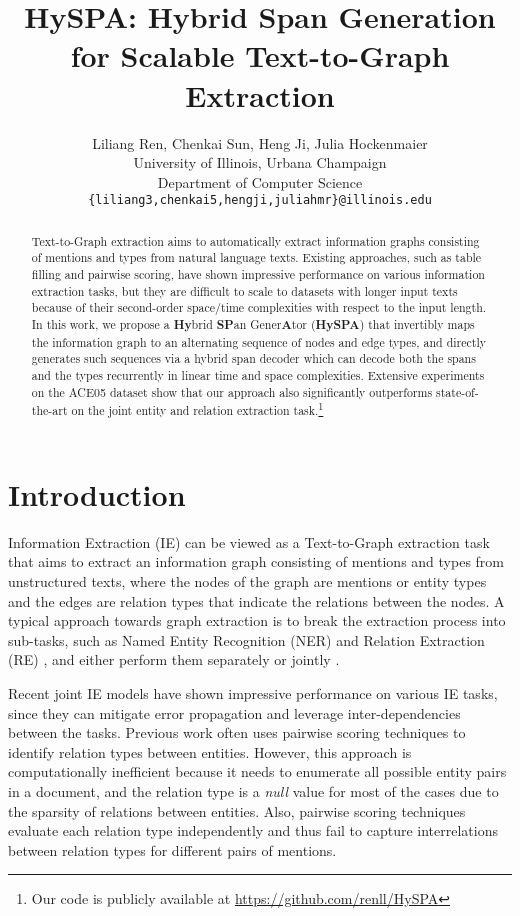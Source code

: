 \documentclass[11pt,a4paper]{article}
\title{HySPA: Hybrid Span Generation for Scalable Text-to-Graph Extraction}
\author{Liliang Ren, Chenkai Sun,  Heng Ji, Julia Hockenmaier\\ 
  University of Illinois, Urbana Champaign\\
  Department of Computer Science \\
  \texttt{\{liliang3,chenkai5,hengji,juliahmr\}@illinois.edu}
  }
\date{}
\begin{document}
\maketitle
\begin{abstract}
Text-to-Graph extraction aims to automatically extract information graphs consisting of mentions and types from natural language texts. Existing approaches, such as table filling and pairwise scoring, have shown impressive performance on various information extraction tasks, but they are difficult to scale to datasets with longer input texts because of their second-order space/time complexities with respect to the input length. In this work, we propose a \textbf{Hy}brid \textbf{SP}an Gener\textbf{A}tor (\textbf{HySPA}) that invertibly maps the information graph to an alternating sequence of nodes and edge types, and directly generates such sequences via a hybrid span decoder which can decode both the spans and the types recurrently in linear time and space complexities. Extensive experiments on the ACE05 dataset show that our approach also significantly outperforms state-of-the-art on the joint entity and relation extraction task.\footnote{Our code is publicly available at \url{https://github.com/renll/HySPA}
}
\end{abstract}
\section{Introduction}

Information Extraction (IE) can be viewed as a Text-to-Graph extraction task that aims to extract an information graph \cite{li-etal-2014-constructing,hgraph} consisting of mentions and types from unstructured texts, where the nodes of the graph are mentions or entity types and the edges are relation types that indicate the relations between the nodes. A typical approach towards graph extraction is to break the extraction process into sub-tasks, such as Named Entity Recognition (NER) \cite{florian-etal-2006-factorizing,florian-etal-2010-improving} and Relation Extraction (RE) \cite{sun-etal-2011-semi,jiang-zhai-2007-systematic}, and either perform them separately \cite{chan-roth-2011-exploiting} or jointly \cite{li-ji-2014-incremental,eberts2019span}.

Recent joint IE models \cite{dygie,tse,lin-etal-2020-joint}  have shown impressive performance on various IE tasks, since they can mitigate  error propagation  and leverage  inter-dependencies between the tasks. 
Previous work often uses pairwise scoring techniques to identify relation types between entities. However, this approach is computationally inefficient because it needs to enumerate all possible entity pairs in a document, and the relation type is a \emph{null} value for most of the cases due to the sparsity of relations between entities. Also,  pairwise scoring techniques evaluate each relation type independently and thus fail to capture  interrelations between relation types for different pairs of mentions.
\end{document}

